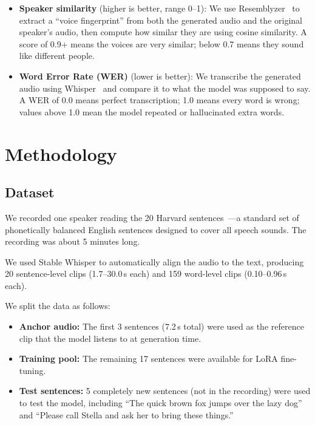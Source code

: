\documentclass[11pt, a4paper]{article}
\begin{document}
\begin{itemize}[itemsep=4pt]
    \item \textbf{Speaker similarity} (higher is better, range 0--1): We use Resemblyzer~\citep{wan2018generalized} to extract a ``voice fingerprint'' from both the generated audio and the original speaker's audio, then compute how similar they are using cosine similarity. A score of 0.9+ means the voices are very similar; below 0.7 means they sound like different people.

    \item \textbf{Word Error Rate (WER)} (lower is better): We transcribe the generated audio using Whisper~\citep{radford2023robust} and compare it to what the model was supposed to say. A WER of 0.0 means perfect transcription; 1.0 means every word is wrong; values above 1.0 mean the model repeated or hallucinated extra words.
\end{itemize}

\section{Methodology}

\subsection{Dataset}

We recorded one speaker reading the 20 Harvard sentences~\citep{rothauser1969ieee}---a standard set of phonetically balanced English sentences designed to cover all speech sounds. The recording was about 5 minutes long.

We used Stable Whisper to automatically align the audio to the text, producing 20 sentence-level clips (1.7--30.0\,s each) and 159 word-level clips (0.10--0.96\,s each).

We split the data as follows:
\begin{itemize}[itemsep=2pt]
    \item \textbf{Anchor audio:} The first 3 sentences (7.2\,s total) were used as the reference clip that the model listens to at generation time.
    \item \textbf{Training pool:} The remaining 17 sentences were available for LoRA fine-tuning.
    \item \textbf{Test sentences:} 5 completely new sentences (not in the recording) were used to test the model, including ``The quick brown fox jumps over the lazy dog'' and ``Please call Stella and ask her to bring these things.''
\end{itemize}
\end{document}

